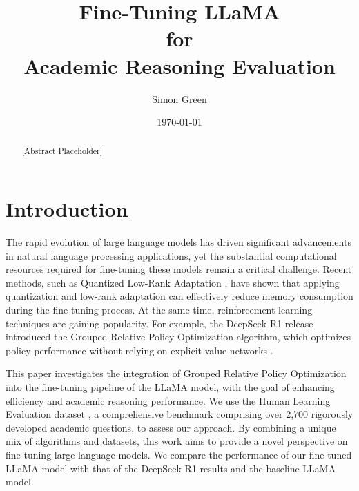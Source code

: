 \documentclass{svproc}
\title{Fine-Tuning LLaMA \\for \\Academic Reasoning Evaluation}
\author{Simon Green\inst{1}}
\institute{
    School of Computing, University of Leeds, UK \\
    \inst{1} MSc, Artificial Intelligence \\
    \email{\{od21sg\}@leeds.ac.uk}
}
\date{\today}
\begin{document}
\maketitle


\begin{abstract}
  [Abstract Placeholder]
\end{abstract}


\section{Introduction}

The rapid evolution of large language models has driven significant advancements in natural language processing applications, yet the substantial computational resources required for fine-tuning these models remain a critical challenge. Recent methods, such as Quantized Low-Rank Adaptation \cite{dettmers2023qloraefficientfinetuningquantized}, have shown that applying quantization and low-rank adaptation can effectively reduce memory consumption during the fine-tuning process. At the same time, reinforcement learning techniques are gaining popularity. For example, the DeepSeek R1 release introduced the Grouped Relative Policy Optimization algorithm, which optimizes policy performance without relying on explicit value networks \cite{shao2024deepseekmathpushinglimitsmathematical, schulman2017proximalpolicyoptimizationalgorithms}.

This paper investigates the integration of Grouped Relative Policy Optimization into the fine-tuning pipeline of the LLaMA model, with the goal of enhancing efficiency and academic reasoning performance. We use the Human Learning Evaluation dataset \cite{phan2025humanitysexam}, a comprehensive benchmark comprising over 2,700 rigorously developed academic questions, to assess our approach. By combining a unique mix of algorithms and datasets, this work aims to provide a novel perspective on fine-tuning large language models. We compare the performance of our fine-tuned LLaMA model with that of the DeepSeek R1 results and the baseline LLaMA model.

\end{document}
